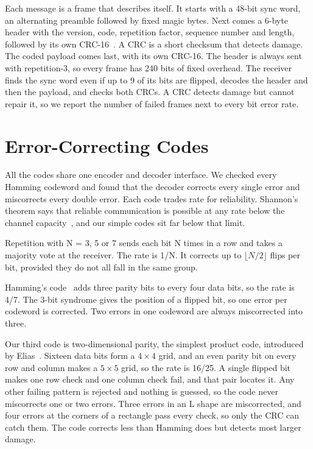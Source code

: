 \documentclass[conference,a4paper]{IEEEtran}
\begin{document}
Each message is a frame that describes itself. It starts with a 48-bit sync word,
an alternating preamble followed by fixed magic bytes. Next comes a 6-byte header with the version,
code, repetition factor, sequence number and length, followed by its own CRC-16~\cite{peterson}. A CRC
is a short checksum that detects damage. The coded payload comes last, with its own CRC-16. The header is
always sent with repetition-3, so every frame has 240 bits of fixed overhead. The receiver finds the
sync word even if up to 9 of its bits are flipped, decodes the header and then the payload, and
checks both CRCs. A CRC detects damage but cannot repair it, so we report the number of failed frames next to every
bit error rate.

\section{Error-Correcting Codes}
All the codes share one encoder and decoder interface. We checked every Hamming codeword and
found that the decoder corrects every single error and miscorrects every double error. Each code trades rate for reliability. Shannon's theorem says that reliable communication is
possible at any rate below the channel capacity~\cite{shannon}, and our simple codes sit far below
that limit.

Repetition with N = 3, 5 or 7 sends each bit N times in a row and takes a
majority vote at the receiver. The rate is 1/N. It corrects up to $\lfloor N/2\rfloor$ flips per
bit, provided they do not all fall in the same group.

Hamming's code~\cite{hamming} adds three parity bits to every four data
bits, so the rate is 4/7. The 3-bit syndrome gives the position of a flipped bit, so one error per
codeword is corrected. Two errors in one codeword are always miscorrected into three.

Our third code is two-dimensional parity, the simplest product
code, introduced by Elias~\cite{elias}. Sixteen data bits form a $4\times4$ grid, and an even
parity bit on every row and column makes a $5\times5$ grid, so the rate is 16/25. A single flipped
bit makes one row check and one column check fail, and that pair locates it. Any other failing
pattern is rejected and nothing is guessed, so the code never miscorrects one or two errors. Three
errors in an L shape are miscorrected, and four errors at the corners of a rectangle pass every
check, so only the CRC can catch them. The code corrects less than Hamming does but detects most
larger damage.
\end{document}
